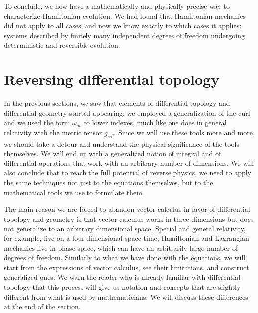 To conclude, we now have a mathematically and physically precise way to characterize Hamiltonian evolution. We had found that Hamiltonian mechanics did not apply to all cases, and now we know exactly to which cases it applies: systems described by finitely many independent degrees of freedom undergoing deterministic and reversible evolution.

\section{Reversing differential topology}

In the previous sections, we saw that elements of differential topology and differential geometry started appearing: we employed a generalization of the curl and we used the form $\omega_{ab}$ to lower indexes, much like one does in general relativity with the metric tensor $g_{\alpha\beta}$. Since we will use these tools more and more, we should take a detour and understand the physical significance of the tools themselves. We will end up with a generalized notion of integral and of differential operations that work with an arbitrary number of dimensions. We will also conclude that to reach the full potential of reverse physics, we need to apply the same techniques not just to the equations themselves, but to the mathematical tools we use to formulate them.


The main reason we are forced to abandon vector calculus in favor of differential topology and geometry is that vector calculus works in three dimensions but does not generalize to an arbitrary dimensional space. Special and general relativity, for example, live on a four-dimensional space-time; Hamiltonian and Lagrangian mechanics live in phase-space, which can have an arbitrarily large number of degrees of freedom. Similarly to what we have done with the equations, we will start from the expressions of vector calculus, see their limitations, and construct generalized ones. We warn the reader who is already familiar with differential topology that this process will give us notation and concepts that are slightly different from what is used by mathematicians. We will discuss these differences at the end of the section.

